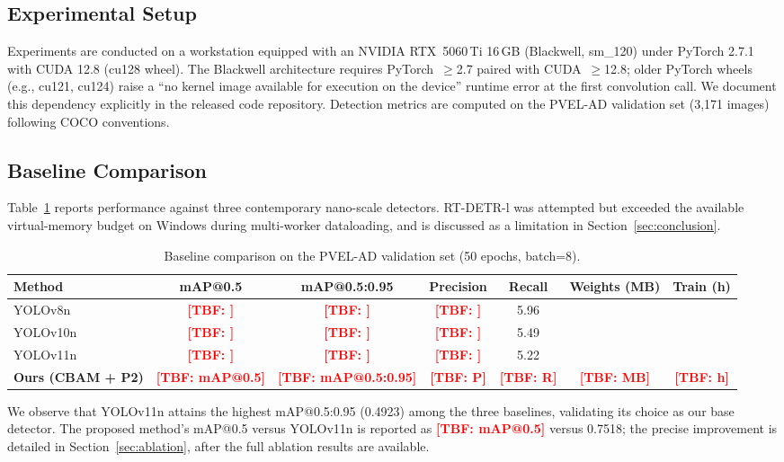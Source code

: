 \documentclass[journal,onecolumn,11pt]{IEEEtran}
\makeatletter
\newcommand{\TBF}[1]{\textcolor{red}{\textbf{[TBF: #1]}}} %
\newcommand{\mAPHalf}{\TBF{mAP@0.5}}
\newcommand{\mAPFull}{\TBF{mAP@0.5:0.95}}
\makeatother
\begin{document}
\subsection{Experimental Setup}
Experiments are conducted on a workstation equipped with an NVIDIA RTX~5060\,Ti 16\,GB (Blackwell, sm\_120) under PyTorch 2.7.1 with CUDA 12.8 (cu128 wheel). The Blackwell architecture requires PyTorch~$\geq$2.7 paired with CUDA~$\geq$12.8; older PyTorch wheels (e.g., cu121, cu124) raise a ``no kernel image available for execution on the device'' runtime error at the first convolution call. We document this dependency explicitly in the released code repository. Detection metrics are computed on the PVEL-AD validation set (3{,}171 images) following COCO conventions.

\subsection{Baseline Comparison}
\label{sec:baseline}
Table~\ref{tab:baseline} reports performance against three contemporary nano-scale detectors. RT-DETR-l \cite{zhao2024rtdetr} was attempted but exceeded the available virtual-memory budget on Windows during multi-worker dataloading, and is discussed as a limitation in Section~\ref{sec:conclusion}.

\begin{table}[!t]
\caption{Baseline comparison on the PVEL-AD validation set (50 epochs, batch=8).}
\label{tab:baseline}
\centering
\renewcommand{\arraystretch}{1.2}
\begin{tabular}{@{}lcccccc@{}}
\toprule
Method & mAP@0.5 & mAP@0.5:0.95 & Precision & Recall & Weights (MB) & Train (h) \\
\midrule
YOLOv8n      & \TBF{} & \TBF{} & \TBF{} & 5.96 \\
YOLOv10n     & \TBF{} & \TBF{} & \TBF{} & 5.49 \\
YOLOv11n     & \TBF{} & \TBF{} & \TBF{} & 5.22 \\
\textbf{Ours (CBAM + P2)}         & \textbf{\mAPHalf} & \textbf{\mAPFull} & \TBF{P} & \TBF{R} & \TBF{MB} & \TBF{h} \\
\bottomrule
\end{tabular}
\end{table}

We observe that YOLOv11n attains the highest mAP@0.5:0.95 (0.4923) among the three baselines, validating its choice as our base detector. The proposed method's mAP@0.5 versus YOLOv11n is reported as \mAPHalf{} versus 0.7518; the precise improvement is detailed in Section~\ref{sec:ablation}, after the full ablation results are available.
\end{document}
